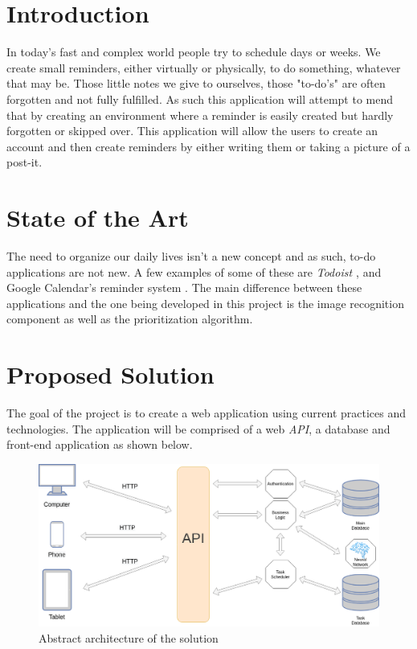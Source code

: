 \documentclass[12pt]{paper}
\begin{document}
	\section{Introduction}
		\setlength{\parindent}{0.5cm}
		In today's fast and complex world people try to schedule days or weeks. We create small reminders, either virtually or physically, to do something, whatever that may be. Those little notes we give to ourselves, those "to-do's" are often forgotten and not fully fulfilled. As such this application will attempt to mend that by creating an environment where a reminder is easily created but hardly forgotten or skipped over.
		This application will allow the users to create an account and then create reminders by either writing them or taking a picture of a post-it.
	
	\section{State of the Art}
		\setlength{\parindent}{0.5cm}
		The need to organize our daily lives isn't a new concept and as such, to-do applications are not new. A few examples of some of these are \textit{Todoist \cite{todoist}}, and Google Calendar's reminder system \cite{google-calendar}.
		The main difference between these applications and the one being developed in this project is the image recognition component as well as the prioritization algorithm.
	
	

	\section{Proposed Solution}
		\setlength{\parindent}{0.5cm}
		The goal of the project is to create a web application using current practices and technologies. The application will be comprised of a web \textit{API}, a database and front-end application as shown below.\\
		\begin{figure}[!h]
			\centering
			\includegraphics[width=150mm,scale=0.8]{./images/abstract-architecture-Page-2.png}
			\caption{Abstract architecture of the solution}
		\end{figure}
		
\end{document}
